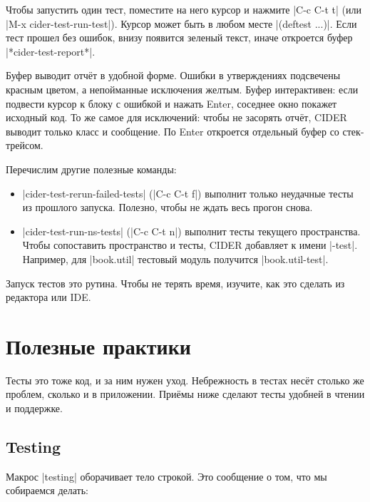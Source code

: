 Чтобы запустить один тест, поместите на него курсор и нажмите \spverb|C-c C-t t|
(или \spverb|M-x cider-test-run-test|). Курсор может быть в любом месте
\spverb|(deftest ...)|. Если тест прошел без ошибок, внизу появится зеленый
текст, иначе откроется буфер \spverb|*cider-test-report*|.

Буфер выводит отчёт в удобной форме. Ошибки в утверждениях подсвечены красным
цветом, а непойманные исключения желтым. Буфер интерактивен: если подвести
курсор к блоку с ошибкой и нажать Enter, соседнее окно покажет исходный код. То
же самое для исключений: чтобы не засорять отчёт, CIDER выводит только класс и
сообщение. По Enter откроется отдельный буфер со стек-трейсом.

Перечислим другие полезные команды:

\begin{itemize}

\item
  \spverb|cider-test-rerun-failed-tests| (\spverb|C-c C-t f|) выполнит только
  неудачные тесты из прошлого запуска. Полезно, чтобы не ждать весь прогон
  снова.

\item
  \spverb|cider-test-run-ns-tests| (\spverb|C-c C-t n|) выполнит тесты текущего
  пространства. Чтобы сопоставить пространство и тесты, CIDER добавляет к имени
  \spverb|-test|. Например, для \spverb|book.util| тестовый модуль получится
  \spverb|book.util-test|.

\end{itemize}

Запуск тестов это рутина. Чтобы не терять время, изучите, как это сделать из
редактора или IDE.

\section{Полезные практики}

Тесты это тоже код, и за ним нужен уход. Небрежность в тестах несёт столько же
проблем, сколько и в приложении. Приёмы ниже сделают тесты удобней в чтении и
поддержке.

\subsection{Testing}


Макрос \spverb|testing| оборачивает тело строкой. Это сообщение о том, что мы
собираемся делать:

